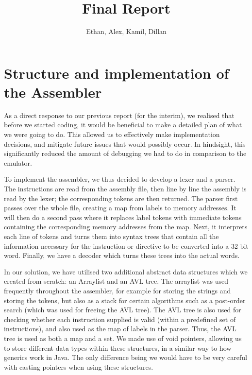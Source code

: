 \documentclass[11pt]{article}
\begin{document}
\title{Final Report}
\author{Ethan, Alex, Kamil, Dillan}

\maketitle

\section{Structure and implementation of the Assembler
}

As a direct response to our previous report (for the interim), we realised that before we started coding, it would be beneficial to make a detailed plan of what we were going to do. This allowed us to effectively make implementation decisions, and mitigate future issues that would possibly occur. In hindsight, this significantly reduced the amount of debugging we had to do in comparison to the emulator.

To implement the assembler, we thus decided to develop a lexer and a parser. The instructions are read from the assembly file, then line by line the assembly is read by the lexer; the corresponding tokens are then returned. The parser first passes over the whole file, creating a map from labels to memory addresses. It will then do a second pass where it replaces label tokens with immediate tokens containing the corresponding memory addresses from the map. Next, it interprets each line of tokens and turns them into syntax trees that contain all the information necessary for the instruction or directive to be converted into a 32-bit word. Finally, we have a decoder which turns these trees into the actual words.

In our solution, we have utilised two additional abstract data structures which we created from scratch: an Arraylist and an AVL tree. The arraylist was used frequently throughout the assembler, for example for storing the strings and storing the tokens, but also as a stack for certain algorithms such as a post-order search (which was used for freeing the AVL tree). The AVL tree is also used for checking whether each instruction supplied is valid (within a predefined set of instructions), and also used as the map of labels in the parser. Thus, the AVL tree is used as both a map and a set. We made use of void pointers, allowing us to store different data types within these structures, in a similar way to how generics work in Java. The only difference being we would have to be very careful with casting pointers when using these structures.
\end{document}
